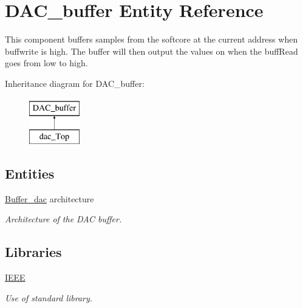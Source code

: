 \hypertarget{classDAC__buffer}{\section{D\-A\-C\-\_\-buffer Entity Reference}
\label{classDAC__buffer}
}


This component buffers samples from the softcore at the current address when buffwrite is high. The buffer will then output the values on when the buff\-Read goes from low to high.  


Inheritance diagram for D\-A\-C\-\_\-buffer\-:\begin{figure}[H]
\begin{center}
\leavevmode
\includegraphics[height=2.000000cm]{classDAC__buffer}
\end{center}
\end{figure}
\subsection*{Entities}
\begin{DoxyCompactItemize}
\item 
\hyperlink{classDAC__buffer_1_1Buffer__dac}{Buffer\-\_\-dac} architecture
\begin{DoxyCompactList}\small\item\em Architecture of the D\-A\-C buffer. \end{DoxyCompactList}\end{DoxyCompactItemize}
\subsection*{Libraries}
 \begin{DoxyCompactItemize}
\item 
\hypertarget{classDAC__buffer_ae4f03c286607f3181e16b9aa12d0c6d4}{\hyperlink{classDAC__buffer_ae4f03c286607f3181e16b9aa12d0c6d4}{I\-E\-E\-E} }\label{classDAC__buffer_ae4f03c286607f3181e16b9aa12d0c6d4}

\begin{DoxyCompactList}\small\item\em Use of standard library. \end{DoxyCompactList}\end{DoxyCompactItemize}
